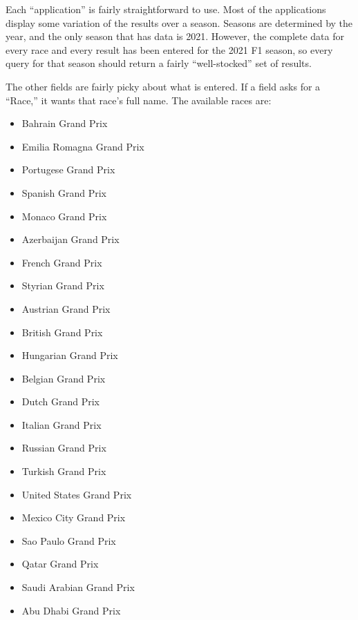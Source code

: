 \documentclass{article} %
\begin{document}
Each ``application'' is fairly straightforward to use. Most of the
applications display some variation of the results over a season.
Seasons are determined by the year, and the only season that has data is
2021. However, the complete data for every race and every result has
been entered for the 2021 F1 season, so every query for that season
should return a fairly ``well-stocked'' set of results.

The other fields are fairly picky about what is entered. If a field asks
for a ``Race,'' it wants that race's full name. The available races are:
\begin{multicols}{2}
\begin{itemize}
    \itemsep-0.1em
    \item Bahrain Grand Prix
    \item Emilia Romagna Grand Prix
    \item Portugese Grand Prix
    \item Spanish Grand Prix
    \item Monaco Grand Prix
    \item Azerbaijan Grand Prix
    \item French Grand Prix
    \item Styrian Grand Prix
    \item Austrian Grand Prix
    \item British Grand Prix
    \item Hungarian Grand Prix
    \item Belgian Grand Prix
    \item Dutch Grand Prix
    \item Italian Grand Prix
    \item Russian Grand Prix
    \item Turkish Grand Prix
    \item United States Grand Prix
    \item Mexico City Grand Prix
    \item Sao Paulo Grand Prix
    \item Qatar Grand Prix
    \item Saudi Arabian Grand Prix
    \item Abu Dhabi Grand Prix
\end{itemize}
\end{multicols}
\end{document}
